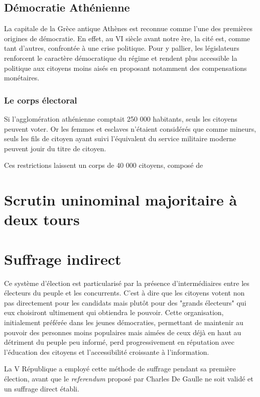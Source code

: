 \documentclass[11pt,a4paper]{report}
\begin{document}
\section{Démocratie Athénienne}
La capitale de la Grèce antique Athènes est reconnue comme l'une des premières origines de démocratie. 
En effet, au VI siècle avant notre ère, la cité est, comme tant d'autres, confrontée à une crise politique. 
Pour y pallier, les législateurs renforcent le caractère démocratique du régime et rendent plus accessible la politique aux citoyens moins aisés en proposant notamment des compensations monétaires.

\subsection{Le corps électoral}
Si l'agglomération athénienne comptait 250 000 habitants\nocite{persee:popu}, seuls les citoyens peuvent voter. 
Or les femmes et esclaves n'étaient considérés que comme mineurs, seuls les fils de citoyen ayant suivi l'équivalent du service militaire moderne peuvent jouir du titre de citoyen.
 
Ces restrictions laissent un corps de 40 000 citoyens, composé de 


\chapter{Scrutin uninominal majoritaire à deux tours}

\chapter{Suffrage indirect}
Ce système d'élection est particularisé par la présence d'intermédiaires entre les électeurs du peuple et les concurrents. 
C'est à dire que les citoyens votent non pas directement pour les candidats mais plutôt pour des "grands électeurs" qui eux choisiront ultimement qui obtiendra le pouvoir.
Cette organisation, initialement préférée dans les jeunes démocraties, permettant de maintenir au pouvoir des personnes moins populaires mais aimées de ceux déjà en haut au détriment du peuple peu informé, perd progressivement en réputation avec l'éducation des citoyens et l'accessibilité croissante à l'information.

La V République a employé cette méthode de suffrage pendant sa première élection, avant que le \textit{referendum} proposé par Charles De Gaulle ne soit validé et un suffrage direct établi.
\end{document}
